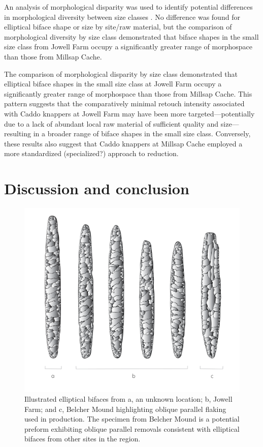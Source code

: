 \documentclass[]{interact}
\theoremstyle{plain}%
\theoremstyle{definition}
\theoremstyle{remark}
\begin{document}
An analysis of morphological disparity was used to identify potential
differences in morphological diversity between size classes
\citep{RN11107,RN7041,RN5694}. No difference was found for elliptical
biface shape or size by site/raw material, but the comparison of
morphological diversity by size class demonstrated that biface shapes in
the small size class from Jowell Farm occupy a significantly greater
range of morphospace than those from Millsap Cache.

The comparison of morphological disparity by size class demonstrated
that elliptical biface shapes in the small size class at Jowell Farm
occupy a significantly greater range of morphospace than those from
Millsap Cache. This pattern suggests that the comparatively minimal
retouch intensity associated with Caddo knappers at Jowell Farm may have
been more targeted---potentially due to a lack of abundant local raw
material of sufficient quality and size---resulting in a broader range
of biface shapes in the small size class. Conversely, these results also
suggest that Caddo knappers at Millsap Cache employed a more
standardized (specialized?) approach to reduction.

\hypertarget{discussion-and-conclusion}{%
\section{Discussion and conclusion}\label{discussion-and-conclusion}}

\begin{figure}\centering
\includegraphics[width=\linewidth]{figs/elliptical.illustration.png}
\caption{Illustrated elliptical bifaces from a, an unknown location; b, Jowell Farm; and c, Belcher Mound highlighting oblique parallel flaking used in production. The specimen from Belcher Mound is a potential preform exhibiting oblique parallel removals consistent with elliptical bifaces from other sites in the region.}
\label{fig:illustration}
\end{figure}
\end{document}
